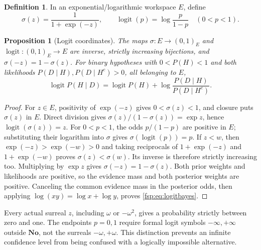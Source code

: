 \documentclass[11pt,a4paper]{article}
\numberwithin{equation}{section}
\newtheorem{proposition}[theorem]{Proposition}
\theoremstyle{definition}
\newtheorem{definition}[theorem]{Definition}
\theoremstyle{remark}
\newcommand{\No}{\mathbf{No}}
\newcommand{\logit}{\operatorname{logit}}
\begin{document}
\begin{definition}
In an exponential/logarithmic workspace $E$, define
\begin{equation}\label{fsp:eq:logit}
 \sigma(z)=\frac{1}{1+\exp(-z)},\qquad
 \logit(p)=\log\frac{p}{1-p}\quad(0<p<1).
\end{equation}
\end{definition}

\begin{proposition}[Logit coordinates]
The maps $\sigma:E\to(0,1)_E$ and $\logit:(0,1)_E\to E$ are inverse,
strictly increasing bijections, and $\sigma(-z)=1-\sigma(z)$.
For binary hypotheses with $0<P(H)<1$ and both likelihoods
$P(D\mid H),P(D\mid H^c)>0$, all belonging to $E$,
\begin{equation}\label{fsp:eq:logitbayes}
 \logit P(H\mid D)=\logit P(H)
 +\log\frac{P(D\mid H)}{P(D\mid H^c)}.
\end{equation}
\end{proposition}
\begin{proof}
For $z\in E$, positivity of $\exp(-z)$ gives $0<\sigma(z)<1$, and
closure puts $\sigma(z)$ in $E$. Direct division gives
$\sigma(z)/(1-\sigma(z))=\exp z$, hence $\logit(\sigma(z))=z$.
For $0<p<1$, the odds $p/(1-p)$ are positive in $E$; substituting
their logarithm into $\sigma$ gives $\sigma(\logit(p))=p$.
If $z<w$, then $\exp(-z)>\exp(-w)>0$ and taking reciprocals of
$1+\exp(-z)$ and $1+\exp(-w)$ proves $\sigma(z)<\sigma(w)$.
Its inverse is therefore strictly increasing too. Multiplying by
$\exp z$ gives $\sigma(-z)=1-\sigma(z)$.
Both prior weights and likelihoods are positive, so the evidence mass
and both posterior weights are positive. Canceling the common evidence
mass in the posterior odds, then applying $\log(xy)=\log x+\log y$,
proves \eqref{fsp:eq:logitbayes}.
\end{proof}

Every actual surreal $z$, including $\omega$ or $-\omega^2$, gives a
probability strictly between zero and one. The endpoints $p=0,1$ require
formal logit symbols $-\infty,+\infty$ outside $\No$, not the surreals
$-\omega,+\omega$. This distinction prevents an infinite confidence level
from being confused with a logically impossible alternative.
\end{document}
